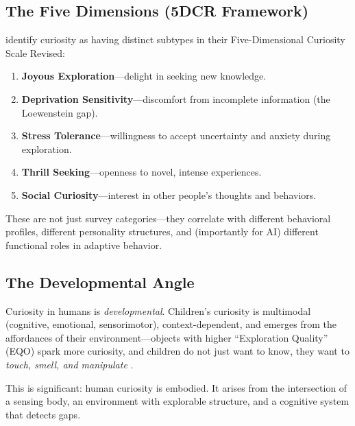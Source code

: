 \subsection{The Five Dimensions (5DCR Framework)}\label{subsec:5dcr}

\citet{kashdan2018} identify curiosity as having distinct subtypes in their Five-Dimensional Curiosity Scale Revised:

\begin{enumerate}[leftmargin=*]
  \item \textbf{Joyous Exploration}---delight in seeking new knowledge.
  \item \textbf{Deprivation Sensitivity}---discomfort from incomplete information (the Loewenstein gap).
  \item \textbf{Stress Tolerance}---willingness to accept uncertainty and anxiety during exploration.
  \item \textbf{Thrill Seeking}---openness to novel, intense experiences.
  \item \textbf{Social Curiosity}---interest in other people's thoughts and behaviors.
\end{enumerate}

These are not just survey categories---they correlate with different behavioral profiles, different personality structures, and (importantly for AI) different functional roles in adaptive behavior.

\subsection{The Developmental Angle}\label{subsec:developmental}

Curiosity in humans is \emph{developmental}. Children's curiosity is multimodal (cognitive, emotional, sensorimotor), context-dependent, and emerges from the affordances of their environment---objects with higher ``Exploration Quality'' (EQO) spark more curiosity, and children do not just want to know, they want to \emph{touch, smell, and manipulate} \citep{baruch2025}.

This is significant: human curiosity is embodied. It arises from the intersection of a sensing body, an environment with explorable structure, and a cognitive system that detects gaps.
